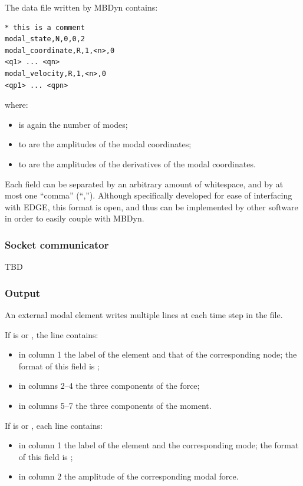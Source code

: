 The data file written by MBDyn contains:
\begin{verbatim}
* this is a comment
modal_state,N,0,0,2
modal_coordinate,R,1,<n>,0
<q1> ... <qn>
modal_velocity,R,1,<n>,0
<qp1> ... <qpn>
\end{verbatim}
where:
\begin{itemize}
\item {} is again the number of modes;
\item {} to  are the amplitudes of the modal coordinates;
\item {} to  are the amplitudes of the derivatives
	of the modal coordinates.
\end{itemize}

Each field can be separated by an arbitrary amount of whitespace,
and by at most one ``comma'' (``,'').
Although specifically developed for ease of interfacing with EDGE,
this format is open, and thus can be implemented by other software
in order to easily couple with MBDyn.



\subsubsection{Socket communicator}
TBD



\subsubsection{Output}
An external modal element writes multiple lines at each time step
in the  file.

If  is  or , the line contains:
\begin{itemize}
\item in column 1 the label of the element and that of the corresponding node;
	the format of this field is ;
\item in columns 2--4 the three components of the force;
\item in columns 5--7 the three components of the moment.
\end{itemize}
If  is  or , each line contains:
\begin{itemize}
\item in column 1 the label of the element and the corresponding mode;
	the format of this field is ;
\item in column 2 the amplitude of the corresponding modal force.
\end{itemize}



